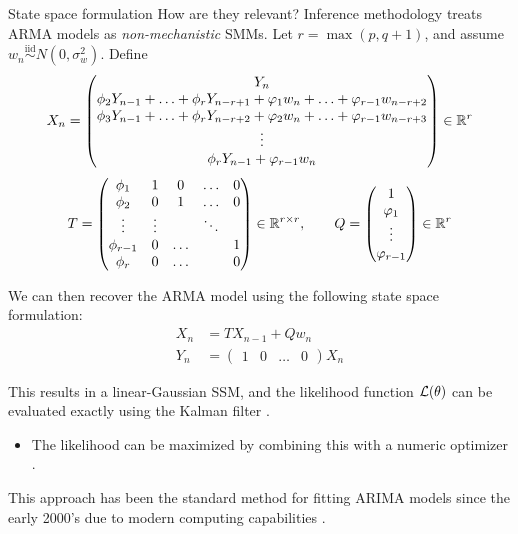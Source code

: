 \documentclass[aspectratio=169]{beamer}\usepackage[]{graphicx}\usepackage[]{xcolor}
\begin{document}
\begin{frame}[allowframebreaks]{State space formulation}
  How are they relevant? Inference methodology treats $\mathrm{ARMA}$ models as \emph{non-mechanistic} SMMs. Let $r = \max(p, q+1)$, and assume $w_n \overset{\mathrm{iid}}{\sim} N(0, \sigma^2_w)$. Define
  \begin{equation*}
    X_n = \begin{pmatrix}
  Y_n \\
  \phi_2 Y_{n - 1} + \ldots + \phi_r Y_{n - r + 1} + \varphi_{1}w_{n} + \ldots + \varphi_{r - 1}w_{n - r + 2} \\
    \phi_3 Y_{n - 1} + \ldots + \phi_r Y_{n - r + 2} + \varphi_{2}w_{n} + \ldots + \varphi_{r - 1}w_{n - r + 3} \\
    \vdots \\
    \phi_r Y_{n - 1} + \varphi_{r - 1}w_n
  \end{pmatrix} \in \mathbb{R}^r
  \end{equation*}
  \begin{equation*}
  T = \begin{pmatrix}
\phi_1 & 1 & 0 & \ldots & 0 \\
\phi_2 & 0 & 1 & \ldots & 0 \\
\vdots & \vdots & & \ddots & \\
\phi_{r-1} & 0 & \ldots &  & 1 \\
\phi_r & 0 & \ldots & & 0
\end{pmatrix} \in \mathbb{R}^{r \times r}, \quad\quad
Q = \begin{pmatrix}
  1 \\ \varphi_1 \\ \vdots \\ \varphi_{r - 1}
\end{pmatrix} \in \mathbb{R}^r
  \end{equation*}

We can then recover the $\mathrm{ARMA}$ model using the following state space formulation:
\begin{align*}
  X_n &= TX_{n - 1} + Qw_n \\
  Y_n &= \begin{pmatrix} 1 & 0 & \ldots & 0\end{pmatrix} X_n
\end{align*}

This results in a linear-Gaussian SSM, and the likelihood function $\mathcal{L}(\theta)$ can be evaluated exactly using the Kalman filter \citep{kalman60}.
\begin{itemize}
  \item The likelihood can be maximized by combining this with a numeric optimizer \citep{gardner1980}.
\end{itemize}

This approach has been the standard method for fitting ARIMA models since the early 2000's due to modern computing capabilities \citep{ripley2002}. 

\end{frame}
\end{document}
